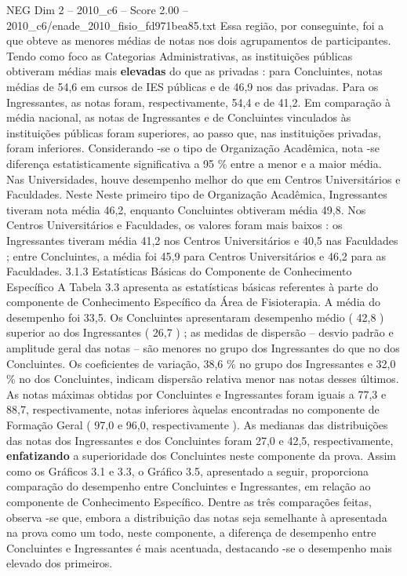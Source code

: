 \begin{textsample}{NEG Dim 2 – 2010\_c6 – Score 2.00 – 2010\_c6/enade\_2010\_fisio\_fd971bea85.txt}
Essa região, por conseguinte, foi a que obteve as menores médias de notas nos dois agrupamentos de participantes.
Tendo como foco as Categorias Administrativas, as instituições públicas obtiveram médias mais \textbf{elevadas} do que as privadas : para Concluintes, notas médias de 54,6 em cursos de IES públicas e de 46,9 nos das privadas.
Para os Ingressantes, as notas foram, respectivamente, 54,4 e de 41,2.
Em comparação à média nacional, as notas de Ingressantes e de Concluintes vinculados às instituições públicas foram superiores, ao passo que, nas instituições privadas, foram inferiores.
Considerando -se o tipo de Organização Acadêmica, nota -se diferença estatisticamente significativa a 95 \% entre a menor e a maior média.
Nas Universidades, houve desempenho melhor do que em Centros Universitários e Faculdades.
Neste Neste primeiro tipo de Organização Acadêmica, Ingressantes tiveram nota média 46,2, enquanto Concluintes obtiveram média 49,8.
Nos Centros Universitários e Faculdades, os valores foram mais baixos : os Ingressantes tiveram média 41,2 nos Centros Universitários e 40,5 nas Faculdades ; entre Concluintes, a média foi 45,9 para Centros Universitários e 46,2 para as Faculdades. 3.1.3 Estatísticas Básicas do Componente de Conhecimento Específico A Tabela 3.3 apresenta as estatísticas básicas referentes à parte do componente de Conhecimento Específico da Área de Fisioterapia.
A média do desempenho foi 33,5.
Os Concluintes apresentaram desempenho médio ( 42,8 ) superior ao dos Ingressantes ( 26,7 ) ; as medidas de dispersão – desvio padrão e amplitude geral das notas – são menores no grupo dos Ingressantes do que no dos Concluintes.
Os coeficientes de variação, 38,6 \% no grupo dos Ingressantes e 32,0 \% no dos Concluintes, indicam dispersão relativa menor nas notas desses últimos.
As notas máximas obtidas por Concluintes e Ingressantes foram iguais a 77,3 e 88,7, respectivamente, notas inferiores àquelas encontradas no componente de Formação Geral ( 97,0 e 96,0, respectivamente ).
As medianas das distribuições das notas dos Ingressantes e dos Concluintes foram 27,0 e 42,5, respectivamente, \textbf{enfatizando} a superioridade dos Concluintes neste componente da prova.
Assim como os Gráficos 3.1 e 3.3, o Gráfico 3.5, apresentado a seguir, proporciona comparação do desempenho entre Concluintes e Ingressantes, em relação ao componente de Conhecimento Específico.
Dentre as três comparações feitas, observa -se que, embora a distribuição das notas seja semelhante à apresentada na prova como um todo, neste componente, a diferença de desempenho entre Concluintes e Ingressantes é mais acentuada, destacando -se o desempenho mais elevado dos primeiros.

\end{textsample}
